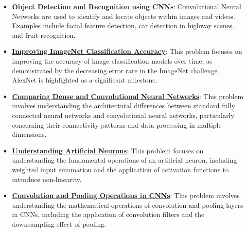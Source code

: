 \documentclass{article}%
\begin{document}
\begin{itemize}[leftmargin=*]%
\item \href{https://purdue.brightspace.com/d2l/common/assets/pdfjs-d2l-dist/1.0.14-legacy/web/viewer.html?file=\%2Fcontent\%2Fenforced\%2F1095467-wl.202510.CS.24300.001\%2F09L1-cnn.pdf\%3Fou\%3D1095467\&lang=en-us\&container=d2l-fileviewer-rendered-pdf\&fullscreen=d2l-fileviewer-rendered-pdf-dialog\&height=667#page=2}{\textbf{Object Detection and Recognition using CNNs}}: Convolutional Neural Networks are used to identify and locate objects within images and videos. Examples include facial feature detection, car detection in highway scenes, and fruit recognition.%
\item \href{https://purdue.brightspace.com/d2l/common/assets/pdfjs-d2l-dist/1.0.14-legacy/web/viewer.html?file=\%2Fcontent\%2Fenforced\%2F1095467-wl.202510.CS.24300.001\%2F09L1-cnn.pdf\%3Fou\%3D1095467\&lang=en-us\&container=d2l-fileviewer-rendered-pdf\&fullscreen=d2l-fileviewer-rendered-pdf-dialog\&height=667#page=3}{\textbf{Improving ImageNet Classification Accuracy}}: This problem focuses on improving the accuracy of image classification models over time, as demonstrated by the decreasing error rate in the ImageNet challenge. AlexNet is highlighted as a significant milestone.%
\item \href{https://purdue.brightspace.com/d2l/common/assets/pdfjs-d2l-dist/1.0.14-legacy/web/viewer.html?file=\%2Fcontent\%2Fenforced\%2F1095467-wl.202510.CS.24300.001\%2F09L1-cnn.pdf\%3Fou\%3D1095467\&lang=en-us\&container=d2l-fileviewer-rendered-pdf\&fullscreen=d2l-fileviewer-rendered-pdf-dialog\&height=667#page=4}{\textbf{Comparing Dense and Convolutional Neural Networks}}: This problem involves understanding the architectural differences between standard fully connected neural networks and convolutional neural networks, particularly concerning their connectivity patterns and data processing in multiple dimensions.%
\item \href{https://purdue.brightspace.com/d2l/common/assets/pdfjs-d2l-dist/1.0.14-legacy/web/viewer.html?file=\%2Fcontent\%2Fenforced\%2F1095467-wl.202510.CS.24300.001\%2F09L1-cnn.pdf\%3Fou\%3D1095467\&lang=en-us\&container=d2l-fileviewer-rendered-pdf\&fullscreen=d2l-fileviewer-rendered-pdf-dialog\&height=667#page=5}{\textbf{Understanding Artificial Neurons}}: This problem focuses on understanding the fundamental operations of an artificial neuron, including weighted input summation and the application of activation functions to introduce non-linearity.%
\item \href{https://purdue.brightspace.com/d2l/common/assets/pdfjs-d2l-dist/1.0.14-legacy/web/viewer.html?file=\%2Fcontent\%2Fenforced\%2F1095467-wl.202510.CS.24300.001\%2F09L1-cnn.pdf\%3Fou\%3D1095467\&lang=en-us\&container=d2l-fileviewer-rendered-pdf\&fullscreen=d2l-fileviewer-rendered-pdf-dialog\&height=667#page=6}{\textbf{Convolution and Pooling Operations in CNNs}}: This problem involves understanding the mathematical operations of convolution and pooling layers in CNNs, including the application of convolution filters and the downsampling effect of pooling.%

\end{itemize}
\end{document}
